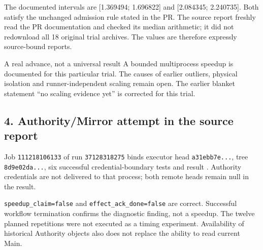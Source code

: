 \begin{cols}
The documented intervals are [1.369494; 1.696822] and [2.084345; 2.240735]. Both satisfy the unchanged admission rule stated in the PR. The source report freshly read the PR documentation and checked its median arithmetic; it did not redownload all 18 original trial archives. The values are therefore expressly source-bound reports.

\begin{boundary}{A real advance, not a universal result}
A bounded multiprocess speedup is documented for this particular trial. The causes of earlier outliers, physical isolation and runner-independent scaling remain open. The earlier blanket statement ``no scaling evidence yet'' is corrected for this trial. 
\end{boundary}

\subsection*{4. Authority/Mirror attempt in the source report}
Job \texttt{111218106133} of run \texttt{37128318275} binds executor head \texttt{a31ebb7e...}, tree \texttt{8d9e02da...}, six successful credential-boundary tests and result . Authority credentials are not delivered to that process; both remote heads remain null in the result. 

\texttt{speedup\_claim=false} and \texttt{effect\_ack\_done=false} are correct. Successful workflow termination confirms the diagnostic finding, not a speedup. The twelve planned repetitions were not executed as a timing experiment. Availability of historical Authority objects also does not replace the ability to read current Main.
\end{cols}

